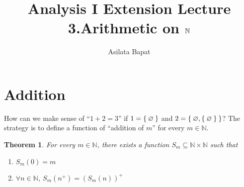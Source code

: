 \documentclass[12pt]{amsart}
\title[Arithmetic on $\bbN$]
	{Analysis I Extension Lecture\\3.Arithmetic on $\bbN$}
\author{Asilata Bapat}
\newcommand{\bbN}{\mathbb{N}}
\theoremstyle{plain}
\newtheorem*{thm}{Theorem}
\theoremstyle{remark}
\theoremstyle{definition}
\begin{document}
\maketitle
{}

\section*{Addition}
How can we make sense of ``$1+2 = 3$'' if $1 = \Set{\varnothing}$ and $2 = \Set{\varnothing, \Set{\varnothing}}$?
The strategy is to define a function of ``addition of $m$'' for every $m \in \bbN$. 

\begin{thm}
	For every $m \in \bbN$, there exists a function $S_m \subseteq \bbN \times \bbN$ such that 
	\begin{enumerate}[(1)]
		\item 
			$S_m(0) = m$
		\item 
			$\forall n \in \bbN$, $S_m(n^+) = (S_m(n))^+$
	\end{enumerate}
\end{thm}
\end{document}
